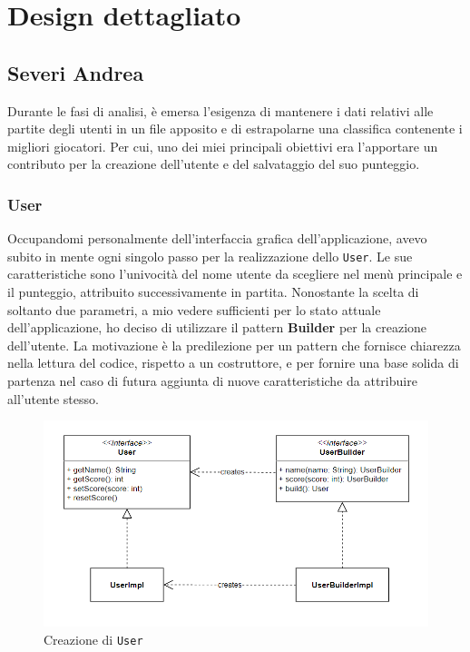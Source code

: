 \documentclass[a4paper,12pt]{report}
\begin{document}
\clearpage

\section{Design dettagliato}
\subsection{Severi Andrea}
Durante le fasi di analisi, è emersa l'esigenza di mantenere i dati relativi alle partite degli utenti in un file apposito e di estrapolarne una classifica contenente i migliori giocatori. Per cui, uno dei miei principali obiettivi era l'apportare un contributo per la creazione dell'utente e del salvataggio del suo punteggio.
\subsubsection{User}
Occupandomi personalmente dell'interfaccia grafica dell'applicazione, avevo subito in mente ogni singolo passo per la realizzazione dello \texttt{User}. 
Le sue caratteristiche sono l'univocità del nome utente da scegliere nel menù principale e il punteggio, attribuito successivamente in partita. Nonostante la scelta di soltanto due parametri, a mio vedere sufficienti per lo stato attuale dell'applicazione, ho deciso di utilizzare il pattern \textbf{Builder} per la creazione dell'utente. La motivazione è la predilezione per un pattern che fornisce chiarezza nella lettura del codice, rispetto a un costruttore, e per fornire una base solida di partenza nel caso di futura aggiunta di nuove caratteristiche da attribuire all'utente stesso.

\begin{figure}[H]
    \begin{center}
        \centering
        \includegraphics[width=\textwidth]{img/Design/Severi/User.png}
    \end{center}
    \caption{Creazione di \texttt{User}}
    \label{img:user}
\end{figure}
\end{document}
